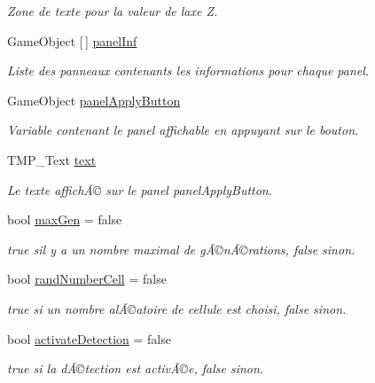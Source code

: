 \begin{DoxyCompactItemize}
\begin{DoxyCompactList}\small\item\em Zone de texte pour la valeur de l\textquotesingle{}axe Z. \end{DoxyCompactList}\item 
Game\+Object \mbox{[}$\,$\mbox{]} \mbox{\hyperlink{class_parameters_a8548a9cf76e7157e3722468f7fa4c275}{panel\+Inf}}
\begin{DoxyCompactList}\small\item\em Liste des panneaux contenants les informations pour chaque panel. \end{DoxyCompactList}\item 
Game\+Object \mbox{\hyperlink{class_parameters_a92c93b0d5d39d8c9eaf80b9aacb6d560}{panel\+Apply\+Button}}
\begin{DoxyCompactList}\small\item\em Variable contenant le panel affichable en appuyant sur le bouton. \end{DoxyCompactList}\item 
T\+M\+P\+\_\+\+Text \mbox{\hyperlink{class_parameters_a872fa6362cb90ff7531c6b6a9dcf38b2}{text}}
\begin{DoxyCompactList}\small\item\em Le texte affichÃ© sur le panel panel\+Apply\+Button. \end{DoxyCompactList}\item 
bool \mbox{\hyperlink{class_parameters_acf7e3f320861b82f33752991e1dc2468}{max\+Gen}} = false
\begin{DoxyCompactList}\small\item\em true s\textquotesingle{}il y a un nombre maximal de gÃ©nÃ©rations, false sinon. \end{DoxyCompactList}\item 
bool \mbox{\hyperlink{class_parameters_aeee7bae840964c99195e90c1a0486e46}{rand\+Number\+Cell}} = false
\begin{DoxyCompactList}\small\item\em true si un nombre alÃ©atoire de cellule est choisi, false sinon. \end{DoxyCompactList}\item 
bool \mbox{\hyperlink{class_parameters_ada09985fa2537e0d28f616e0d9b86fb4}{activate\+Detection}} = false
\begin{DoxyCompactList}\small\item\em true si la dÃ©tection est activÃ©e, false sinon. \end{DoxyCompactList}\item 

\end{DoxyCompactItemize}
